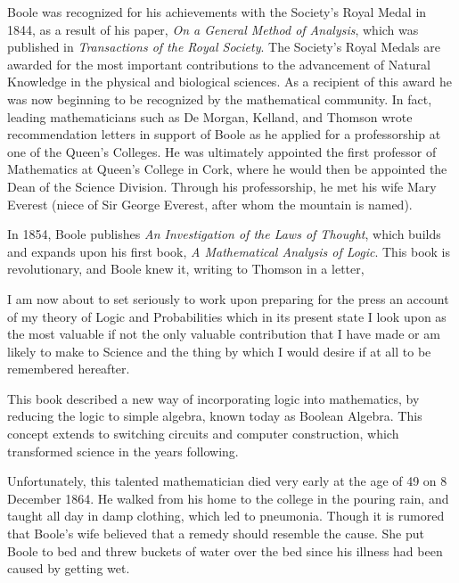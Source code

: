 \documentclass[12]{article} %
\begin{document}
Boole was recognized for his achievements with the Society's Royal Medal in 1844, as a result of his paper, \textit {On a General Method of Analysis}, which was published in \textit{Transactions of the Royal Society}.  The Society's Royal Medals are awarded for the most important contributions to the advancement of Natural Knowledge in the physical and biological sciences. As a recipient of this award he was now beginning to be recognized by the mathematical community. In fact, leading mathematicians such as De Morgan, Kelland, and Thomson wrote recommendation letters in support of Boole as he applied for a professorship at one of the Queen's Colleges. He was ultimately appointed the first professor of Mathematics at Queen's College in Cork, where he would then be appointed the Dean of the Science Division. Through his professorship, he met his wife Mary Everest (niece of Sir George Everest, after whom the mountain is named).

In 1854, Boole publishes \textit{An Investigation of the Laws of Thought}, which builds and expands upon his first book, \textit{A Mathematical Analysis of Logic}. This book is revolutionary, and Boole knew it, writing to Thomson in a letter, 
\begin{displayquote}
I am now about to set seriously to work upon preparing for the press an account of my theory of Logic and Probabilities which in its present state I look upon as the most valuable if not the only valuable contribution that I have made or am likely to make to Science and the thing by which I would desire if at all to be remembered hereafter. \cite{MacTutor}
\end{displayquote}
\noindent This book described a new way of incorporating logic into mathematics, by reducing the logic to simple algebra, known today as Boolean Algebra. This concept extends to switching circuits and computer construction, which transformed science in the years following.

Unfortunately, this talented mathematician died very early at the age of 49 on 8 December 1864. He walked from his home to the college in the pouring rain, and taught all day in damp clothing, which led to pneumonia. Though it is rumored that Boole's wife believed that a remedy should resemble the cause. She put Boole to bed and threw buckets of water over the bed since his illness had been caused by getting wet. 
\end{document}
